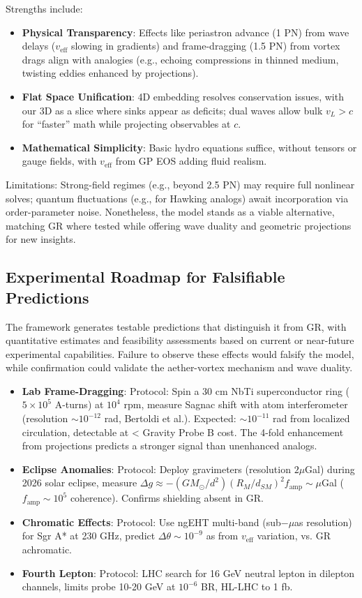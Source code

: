 \documentclass{article}
\begin{document}
Strengths include:
\begin{itemize}
\item \textbf{Physical Transparency}: Effects like periastron advance (1 PN) from wave delays ($v_{\text{eff}}$ slowing in gradients) and frame-dragging (1.5 PN) from vortex drags align with analogies (e.g., echoing compressions in thinned medium, twisting eddies enhanced by projections).
\item \textbf{Flat Space Unification}: 4D embedding resolves conservation issues, with our 3D as a slice where sinks appear as deficits; dual waves allow bulk $v_L > c$ for ``faster'' math while projecting observables at $c$.
\item \textbf{Mathematical Simplicity}: Basic hydro equations suffice, without tensors or gauge fields, with $v_{\text{eff}}$ from GP EOS adding fluid realism.
\end{itemize}

Limitations: Strong-field regimes (e.g., beyond 2.5 PN) may require full nonlinear solves; quantum fluctuations (e.g., for Hawking analogs) await incorporation via order-parameter noise. Nonetheless, the model stands as a viable alternative, matching GR where tested while offering wave duality and geometric projections for new insights.

\subsection{Experimental Roadmap for Falsifiable Predictions}

The framework generates testable predictions that distinguish it from GR, with quantitative estimates and feasibility assessments based on current or near-future experimental capabilities. Failure to observe these effects would falsify the model, while confirmation could validate the aether-vortex mechanism and wave duality.

\begin{itemize}
    \item \textbf{Lab Frame-Dragging}: Protocol: Spin a 30 cm NbTi superconductor ring ($5 \times 10^5$ A-turns) at $10^4$ rpm, measure Sagnac shift with atom interferometer (resolution $\sim 10^{-12}$ rad, Bertoldi et al.). Expected: $\sim 10^{-11}$ rad from localized circulation, detectable at < Gravity Probe B cost. The 4-fold enhancement from projections predicts a stronger signal than unenhanced analogs.
    \item \textbf{Eclipse Anomalies}: Protocol: Deploy gravimeters (resolution $2 \mu$Gal) during 2026 solar eclipse, measure $\Delta g \approx - (GM_\odot / d^2) (R_M / d_{SM})^2 f_{\text{amp}} \sim \mu$Gal ($f_{\text{amp}} \sim 10^5$ coherence). Confirms shielding absent in GR.
    \item \textbf{Chromatic Effects}: Protocol: Use ngEHT multi-band (sub$-\mu$as resolution) for Sgr A* at 230 GHz, predict $\Delta \theta \sim 10^{-9}$ as from $v_{\text{eff}}$ variation, vs. GR achromatic.
    \item \textbf{Fourth Lepton}: Protocol: LHC search for 16 GeV neutral lepton in dilepton channels, limits probe 10-20 GeV at $10^{-6}$ BR, HL-LHC to 1 fb.
\end{itemize}
\end{document}
